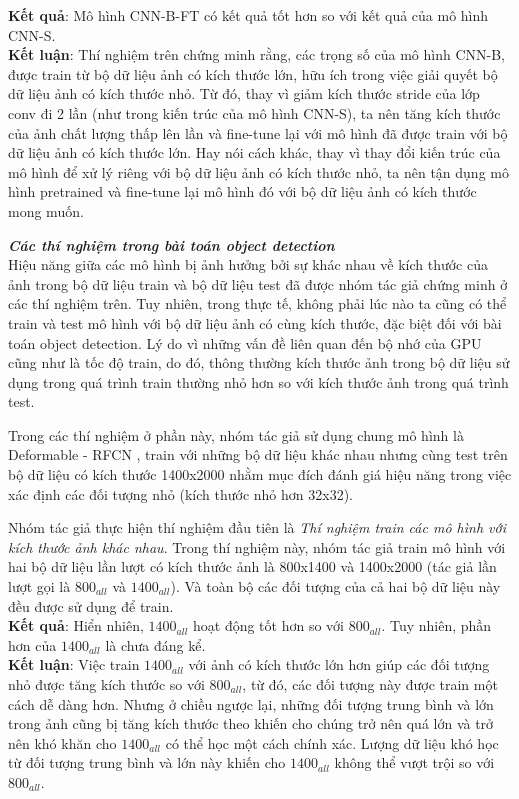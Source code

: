 {    \noindent
    \textbf{Kết quả}:
    Mô hình CNN-B-FT có kết quả tốt hơn so với kết quả của mô hình CNN-S. \\
    \textbf{Kết luận}:
    Thí nghiệm trên chứng minh rằng, các trọng số của mô hình CNN-B, được train từ bộ dữ liệu ảnh có kích thước lớn, hữu ích trong việc giải quyết bộ dữ liệu ảnh có kích thước nhỏ.
    Từ đó, thay vì giảm kích thước stride của lớp conv đi 2 lần (như trong kiến trúc của mô hình CNN-S), ta nên tăng kích thước của ảnh chất lượng thấp lên lần và fine-tune lại với mô hình đã được train với bộ dữ liệu ảnh có kích thước lớn.
    Hay nói cách khác, thay vì thay đổi kiến trúc của mô hình để xử lý riêng với bộ dữ liệu ảnh có kích thước nhỏ, ta nên tận dụng mô hình pretrained và fine-tune lại mô hình đó với bộ dữ liệu ảnh có kích thước mong muốn.

    \noindent
    \textbf{\textit{Các thí nghiệm trong bài toán object detection}} \\
    Hiệu năng giữa các mô hình bị ảnh hưởng bởi sự khác nhau về kích thước của ảnh trong bộ dữ liệu train và bộ dữ liệu test đã được nhóm tác giả chứng minh ở các thí nghiệm trên.
    Tuy nhiên, trong thực tế, không phải lúc nào ta cũng có thể train và test mô hình với bộ dữ liệu ảnh có cùng kích thước, đặc biệt đối với bài toán object detection.
    Lý do vì những vấn đề liên quan đến bộ nhớ của GPU cũng như là tốc độ train, do đó, thông thường kích thước ảnh trong bộ dữ liệu sử dụng trong quá trình train thường nhỏ hơn so với kích thước ảnh trong quá trình test.

    \noindent
    Trong các thí nghiệm ở phần này, nhóm tác giả sử dụng chung mô hình là Deformable - RFCN \cite{dai2017deformable}, train với những bộ dữ liệu khác nhau nhưng cùng test trên bộ dữ liệu có kích thước 1400x2000 nhằm mục đích đánh giá hiệu năng trong việc xác định các đối tượng nhỏ (kích thước nhỏ hơn 32x32).

    \noindent
    Nhóm tác giả thực hiện thí nghiệm đầu tiên là \textit{Thí nghiệm train các mô hình với kích thước ảnh khác nhau}.
    Trong thí nghiệm này, nhóm tác giả train mô hình với hai bộ dữ liệu lần lượt có kích thước ảnh là 800x1400 và 1400x2000 (tác giả lần lượt gọi là ${800}_{all}$ và ${1400}_{all}$).
    Và toàn bộ các đối tượng của cả hai bộ dữ liệu này đều được sử dụng để train. \\
    \textbf{Kết quả}:
    Hiển nhiên, ${1400}_{all}$ hoạt động tốt hơn so với ${800}_{all}$.
    Tuy nhiên, phần hơn của ${1400}_{all}$ là chưa đáng kể. \\
    \textbf{Kết luận}:
    Việc train ${1400}_{all}$ với ảnh có kích thước lớn hơn giúp các đối tượng nhỏ được tăng kích thước so với ${800}_{all}$, từ đó, các đối tượng này được train một cách dễ dàng hơn.
    Nhưng ở chiều ngược lại, những đối tượng trung bình và lớn trong ảnh cũng bị tăng kích thước theo khiến cho chúng trở nên quá lớn và trở nên khó khăn cho ${1400}_{all}$ có thể học một cách chính xác.
    Lượng dữ liệu khó học từ đối tượng trung bình và lớn này khiến cho ${1400}_{all}$ không thể vượt trội so với ${800}_{all}$.

}
